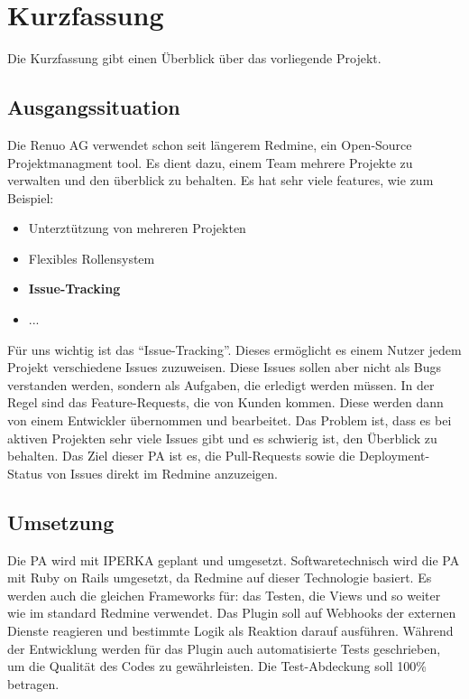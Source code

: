 \chapter{Kurzfassung}

Die Kurzfassung gibt einen Überblick über das vorliegende Projekt.

\section{Ausgangssituation}

Die Renuo AG verwendet schon seit längerem Redmine, ein \gls{Open-Source} Projektmanagment tool. Es dient dazu, einem
Team mehrere Projekte zu verwalten und den überblick zu behalten. Es hat sehr viele features, wie zum Beispiel: \cite{redmine_homepage}
\begin{itemize}
    \item Unterztützung von mehreren Projekten
    \item Flexibles Rollensystem
    \item \textbf{Issue-Tracking}
    \item ...
\end{itemize}
Für uns wichtig ist das \enquote{Issue-Tracking}. Dieses ermöglicht es einem Nutzer jedem Projekt verschiedene Issues zuzuweisen.
Diese Issues sollen aber nicht als Bugs verstanden werden, sondern als Aufgaben, die erledigt werden müssen. In der Regel sind das
\gls{Feature-Requests}, die von Kunden kommen. Diese werden dann von einem Entwickler übernommen und bearbeitet. \newline
Das Problem ist, dass es bei aktiven Projekten sehr viele Issues gibt und es schwierig ist, den Überblick zu behalten.
Das Ziel dieser PA ist es, die \gls{Pull-Request}s sowie die \gls{Deployment}-Status von Issues direkt im Redmine anzuzeigen.

\section{Umsetzung}

Die PA wird mit IPERKA geplant und umgesetzt. \newline
Softwaretechnisch wird die PA mit Ruby on Rails umgesetzt, da Redmine auf dieser Technologie basiert. Es werden auch
die gleichen Frameworks für: das Testen, die Views und so weiter wie im standard Redmine verwendet. \newline
Das Plugin soll auf Webhooks der externen Dienste reagieren und bestimmte Logik als Reaktion darauf ausführen. \newline
Während der Entwicklung werden für das Plugin auch automatisierte Tests geschrieben, um die Qualität des Codes zu gewährleisten.
Die Test-Abdeckung soll 100\% betragen.

